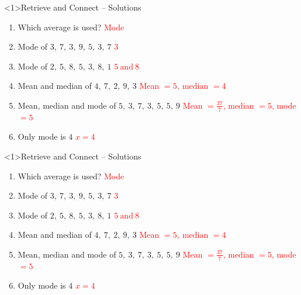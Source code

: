 \documentclass{beamer}
\begin{document}
\begin{frame}<1>{Retrieve and Connect -- Solutions}
\vspace{-0.8em}

\footnotesize
\begin{enumerate}\itemsep2pt
  \item Which average is used?  
        \textcolor{red}{Mode}
  \item Mode of $3,\ 7,\ 3,\ 9,\ 5,\ 3,\ 7$  
        \textcolor{red}{$3$}
  \item Mode of $2,\ 5,\ 8,\ 5,\ 3,\ 8,\ 1$  
        \textcolor{red}{$5\ \text{and}\ 8$}
  \item Mean and median of $4,\ 7,\ 2,\ 9,\ 3$  
        \textcolor{red}{Mean $=5,\ \text{median }=4$}
  \item Mean, median and mode of $5,\ 3,\ 7,\ 3,\ 5,\ 5,\ 9$  
        \textcolor{red}{Mean $=\frac{37}{7}$, median $=5$, mode $=5$}
  \item Only mode is $4$  
        \textcolor{red}{$x=4$}
\end{enumerate}
\end{frame}
\begin{frame}<1>{Retrieve and Connect -- Solutions}
\vspace{-0.8em}

\footnotesize
\begin{enumerate}\itemsep2pt
  \item Which average is used?  
        \textcolor{red}{Mode}
  \item Mode of $3,\ 7,\ 3,\ 9,\ 5,\ 3,\ 7$  
        \textcolor{red}{$3$}
  \item Mode of $2,\ 5,\ 8,\ 5,\ 3,\ 8,\ 1$  
        \textcolor{red}{$5\ \text{and}\ 8$}
  \item Mean and median of $4,\ 7,\ 2,\ 9,\ 3$  
        \textcolor{red}{Mean $=5,\ \text{median }=4$}
  \item Mean, median and mode of $5,\ 3,\ 7,\ 3,\ 5,\ 5,\ 9$  
        \textcolor{red}{Mean $=\frac{37}{7}$, median $=5$, mode $=5$}
  \item Only mode is $4$  
        \textcolor{red}{$x=4$}
\end{enumerate}
\end{frame}
\end{document}
